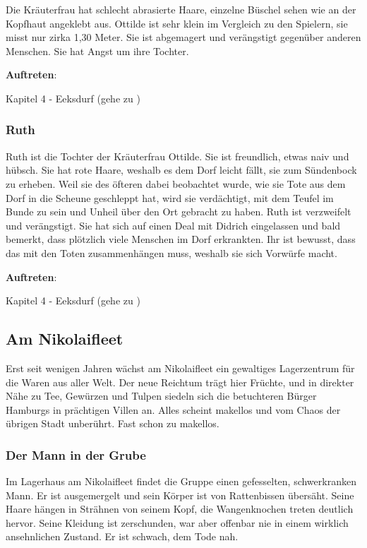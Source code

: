 Die Kräuterfrau hat schlecht abrasierte Haare, einzelne Büschel sehen wie an der Kopfhaut angeklebt aus. Ottilde ist sehr klein im Vergleich zu den Spielern, sie misst nur zirka 1,30 Meter. Sie ist abgemagert und verängstigt gegenüber anderen Menschen. Sie hat Angst um ihre Tochter.

\textbf{Auftreten}:

Kapitel 4 - Eeksdurf (gehe zu \blue{\ref{inxd}})

\subsubsection*{Ruth}
\label{Ruth}

Ruth ist die Tochter der Kräuterfrau Ottilde. Sie ist freundlich, etwas naiv und hübsch. Sie hat rote Haare, weshalb es dem Dorf leicht fällt, sie zum Sündenbock zu erheben. Weil sie des öfteren dabei beobachtet wurde, wie sie Tote aus dem Dorf in die Scheune geschleppt hat, wird sie verdächtigt, mit dem Teufel im Bunde zu sein und Unheil über den Ort gebracht zu haben. Ruth ist verzweifelt und verängstigt. Sie hat sich auf einen Deal mit Didrich eingelassen und bald bemerkt, dass plötzlich viele Menschen im Dorf erkrankten. Ihr ist bewusst, dass das mit den Toten zusammenhängen muss, weshalb sie sich Vorwürfe macht.

\textbf{Auftreten}:

Kapitel 4 - Eeksdurf (gehe zu \blue{\ref{inxd}})

\subsection{Am Nikolaifleet}

Erst seit wenigen Jahren wächst am Nikolaifleet ein gewaltiges Lagerzentrum für die Waren aus aller Welt. Der neue Reichtum trägt hier Früchte, und in direkter Nähe zu Tee, Gewürzen und Tulpen siedeln sich die betuchteren Bürger Hamburgs in prächtigen Villen an. Alles scheint makellos und vom Chaos der übrigen Stadt unberührt. Fast schon zu makellos.

\subsubsection*{Der Mann in der Grube}
\label{Grubenmann}

Im Lagerhaus am Nikolaifleet findet die Gruppe einen gefesselten, schwerkranken Mann. Er ist ausgemergelt und sein Körper ist von Rattenbissen übersäht. Seine Haare hängen in Strähnen von seinem Kopf, die Wangenknochen treten deutlich hervor. Seine Kleidung ist zerschunden, war aber offenbar nie in einem wirklich ansehnlichen Zustand. Er ist schwach, dem Tode nah.

